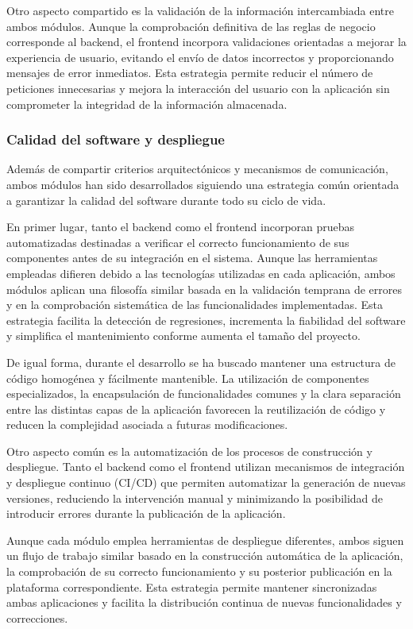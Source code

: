 Otro aspecto compartido es la validación de la información intercambiada entre ambos módulos. Aunque la comprobación definitiva de las reglas de negocio corresponde al backend, el frontend incorpora validaciones orientadas a mejorar la experiencia de usuario, evitando el envío de datos incorrectos y proporcionando mensajes de error inmediatos. Esta estrategia permite reducir el número de peticiones innecesarias y mejora la interacción del usuario con la aplicación sin comprometer la integridad de la información almacenada.

\subsubsection{Calidad del software y despliegue}

Además de compartir criterios arquitectónicos y mecanismos de comunicación, ambos módulos han sido desarrollados siguiendo una estrategia común orientada a garantizar la calidad del software durante todo su ciclo de vida.

En primer lugar, tanto el backend como el frontend incorporan pruebas automatizadas destinadas a verificar el correcto funcionamiento de sus componentes antes de su integración en el sistema. Aunque las herramientas empleadas difieren debido a las tecnologías utilizadas en cada aplicación, ambos módulos aplican una filosofía similar basada en la validación temprana de errores y en la comprobación sistemática de las funcionalidades implementadas. Esta estrategia facilita la detección de regresiones, incrementa la fiabilidad del software y simplifica el mantenimiento conforme aumenta el tamaño del proyecto.

De igual forma, durante el desarrollo se ha buscado mantener una estructura de código homogénea y fácilmente mantenible. La utilización de componentes especializados, la encapsulación de funcionalidades comunes y la clara separación entre las distintas capas de la aplicación favorecen la reutilización de código y reducen la complejidad asociada a futuras modificaciones.

Otro aspecto común es la automatización de los procesos de construcción y despliegue. Tanto el backend como el frontend utilizan mecanismos de integración y despliegue continuo (CI/CD) que permiten automatizar la generación de nuevas versiones, reduciendo la intervención manual y minimizando la posibilidad de introducir errores durante la publicación de la aplicación.

Aunque cada módulo emplea herramientas de despliegue diferentes, ambos siguen un flujo de trabajo similar basado en la construcción automática de la aplicación, la comprobación de su correcto funcionamiento y su posterior publicación en la plataforma correspondiente. Esta estrategia permite mantener sincronizadas ambas aplicaciones y facilita la distribución continua de nuevas funcionalidades y correcciones.

